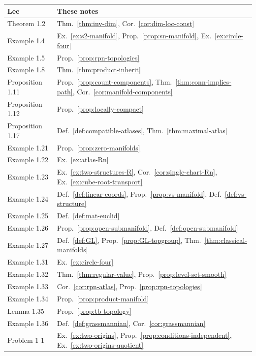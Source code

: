 \documentclass[11pt]{report}
\begin{document}
{\small
\begin{longtable}{>{\raggedright\arraybackslash}p{3.6cm} >{\raggedright\arraybackslash}p{11.2cm}}
\toprule
\textbf{Lee} & \textbf{These notes} \\ \midrule \endhead
Theorem 1.2 & Thm.~\ref{thm:inv-dim}, Cor.~\ref{cor:dim-loc-const} \\
Example 1.4 & Ex.~\ref{ex:s2-manifold}, Prop.~\ref{prop:sn-manifold}, Ex.~\ref{ex:circle-four} \\
Example 1.5 & Prop.~\ref{prop:rpn-topologies} \\
Example 1.8 & Thm.~\ref{thm:product-inherit} \\
Proposition 1.11 & Prop.~\ref{prop:count-components}, Thm.~\ref{thm:conn-implies-path}, Cor.~\ref{cor:manifold-components} \\
Proposition 1.12 & Prop.~\ref{prop:locally-compact} \\
Proposition 1.17 & Def.~\ref{def:compatible-atlases}, Thm.~\ref{thm:maximal-atlas} \\
Example 1.21 & Prop.~\ref{prop:zero-manifolds} \\
Example 1.22 & Ex.~\ref{ex:atlas-Rn} \\
Example 1.23 & Ex.~\ref{ex:two-structures-R}, Cor.~\ref{cor:single-chart-Rn}, Ex.~\ref{ex:cube-root-transport} \\
Example 1.24 & Def.~\ref{def:linear-coords}, Prop.~\ref{prop:vs-manifold}, Def.~\ref{def:vs-structure} \\
Example 1.25 & Def.~\ref{def:mat-euclid} \\
Example 1.26 & Prop.~\ref{prop:open-submanifold}, Def.~\ref{def:open-submanifold} \\
Example 1.27 & Def.~\ref{def:GL}, Prop.~\ref{prop:GL-topgroup}, Thm.~\ref{thm:classical-manifolds} \\
Example 1.31 & Ex.~\ref{ex:circle-four} \\
Example 1.32 & Thm.~\ref{thm:regular-value}, Prop.~\ref{prop:level-set-smooth} \\
Example 1.33 & Cor.~\ref{cor:rpn-atlas}, Prop.~\ref{prop:rpn-topologies} \\
Example 1.34 & Prop.~\ref{prop:product-manifold} \\
Lemma 1.35 & Prop.~\ref{prop:tb-topology} \\
Example 1.36 & Def.~\ref{def:grassmannian}, Cor.~\ref{cor:grassmannian} \\
Problem 1-1 & Ex.~\ref{ex:two-origins}, Prop.~\ref{prop:conditions-independent}, Ex.~\ref{ex:two-origins-quotient} \\

\end{longtable}}
\end{document}
